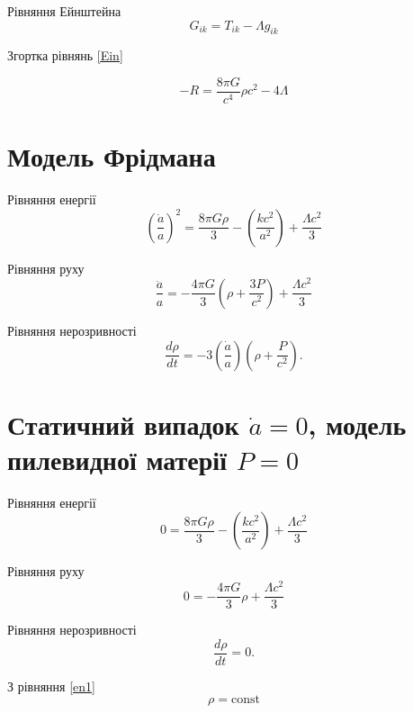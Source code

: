\documentclass[14pt]{extarticle}
\title{}
\author{}
\begin{document}
Рівняння Ейнштейна
\begin{equation}\label{Ein}
G_{ik} = T_{ik} - \Lambda g_{ik}
\end{equation}

Згортка рівнянь \eqref{Ein}

\begin{equation}\label{EinC}
	 -R = \frac{8\pi G}{c^4} \rho c^2 - 4\Lambda
\end{equation}
\section*{Модель Фрідмана}


Рівняння енергії
\begin{equation}\label{en}
\left({\frac {\dot {a}}{a}}\right)^{2}={\frac {8\pi G\rho }{3}}-\left({\frac {kc^{2}}{a^{2}}}\right)+{\frac {\Lambda c^{2}}{3}}
\end{equation}

Рівняння руху
\begin{equation}\label{mot}
\frac {\ddot {a}}{a}=-{\frac {4\pi G}{3}}\left(\rho +{\frac {3P}{c^{2}}}\right)+{\frac {\Lambda c^{2}}{3}} 
\end{equation}

Рівняння нерозривності
\begin{equation}\label{con}
\frac {d\rho }{dt}=-3\left({\frac {\dot {a}}{a}}\right)\left(\rho +{\frac {P}{c^{2}}}\right).
\end{equation}

\section*{Статичний випадок $\dot {a} = 0$, модель пилевидної матерії $P=0$}

Рівняння енергії
\begin{equation}\label{en1}
0={\frac {8\pi G\rho }{3}}-\left({\frac {kc^{2}}{a^{2}}}\right)+{\frac {\Lambda c^{2}}{3}}
\end{equation}

Рівняння руху
\begin{equation}\label{mot1}
0=-{\frac {4\pi G}{3}}\rho +{\frac {\Lambda c^{2}}{3}} 
\end{equation}

Рівняння нерозривності
\begin{equation}\label{con1}
\frac {d\rho }{dt}=0.
\end{equation}

З рівняння \eqref{en1} 
\begin{equation}\label{rho}
	\rho=\mathrm{const}
\end{equation}
\end{document}
